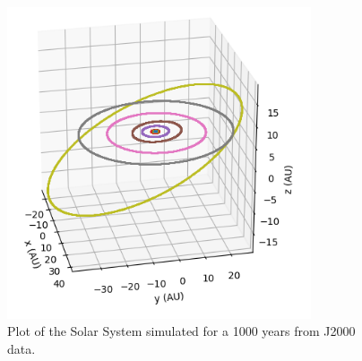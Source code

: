 \documentclass[11pt, oneside]{article}   	%
\begin{document}
\begin{figure}[!h]
\begin{center}
\includegraphics[width= 0.8\textwidth]{SolarSystem3D_rsz}
\caption[]{Plot of the Solar System simulated for a 1000 years from J2000 data.}
\label{}
\end{center}
\end{figure}

\newpage


 

\end{document}
